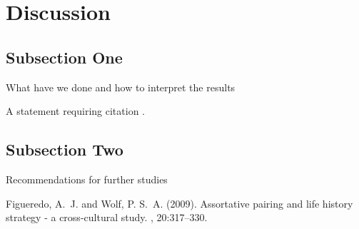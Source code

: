 \documentclass[twoside,twocolumn]{article}
\begin{document}
	\section{Discussion}
	
	\subsection{Subsection One}
	
	What have we done and how to interpret the results
	
	A statement requiring citation \cite{Figueredo:2009dg}.
	\blindtext %
	
	\subsection{Subsection Two}
	
	Recommendations for further studies
	
	\blindtext %
	
	
	\begin{thebibliography}{99} %
		
		Figueredo, A.~J. and Wolf, P. S.~A. (2009).
		\newblock Assortative pairing and life history strategy - a cross-cultural
		study.
		, 20:317--330.
		
	\end{thebibliography}
	
	
\end{document}
